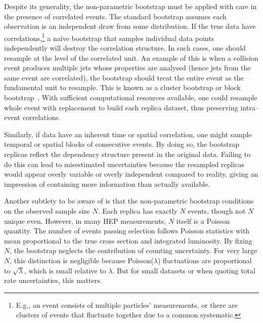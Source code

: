             Despite its generality, the non-parametric bootstrap must be applied with care in the presence of correlated events.
            The standard bootstrap assumes each observation is an independent draw from some distribution.
            If the true data have correlations,\footnote{E.g., an event consists of multiple particles' measurements, or there are clusters of events that fluctuate together due to a common systematic.} a na\"ive bootstrap that samples individual data points independently will destroy the correlation structure.
            In such cases, one should resample at the level of the correlated unit.
            An example of this is when a collision event produces multiple jets whose properties are analysed (hence jets from the same event are correlated), the bootstrap should treat the entire event as the fundamental unit to resample.
            This is known as a cluster bootstrap or block bootstrap~\cite{cameron_bootstrap-based_2008, kunsch_jackknife_1989, field_bootstrapping_2007, mackinnon_cluster-robust_2022, loy_bootstrapping_2021}.
            With sufficient computational resources available, one could resample whole event with replacement to build each replica dataset, thus preserving intra--event correlations.
            
            Similarly, if data have an inherent time or spatial correlation, one might sample temporal or spatial blocks of consecutive events.
            By doing so, the bootstrap replicas reflect the dependency structure present in the original data.
            Failing to do this can lead to misestimated uncertainties because the resampled replicas would appear overly variable or overly independent compared to reality, giving an impression of containing more information than actually available.

            Another subtlety to be aware of is that the non-parametric bootstrap conditions on the observed sample size $N$.
            Each replica has exactly $N$ events, though not $N$ unique even.
            However, in many HEP measurements, $N$ itself is a Poisson quantity.
            The number of events passing selection follows Poisson statistics with mean proportional to the true cross section and integrated luminosity.
            By fixing $N$, the bootstrap neglects the contribution of counting uncertainty.
            For very large $N$, this distinction is negligible because Poisson($\lambda$) fluctuations are proportional to $\sqrt{\lambda}$, which is small relative to $\lambda$.
            But for small datasets or when quoting total rate uncertainties, this matters.
            
